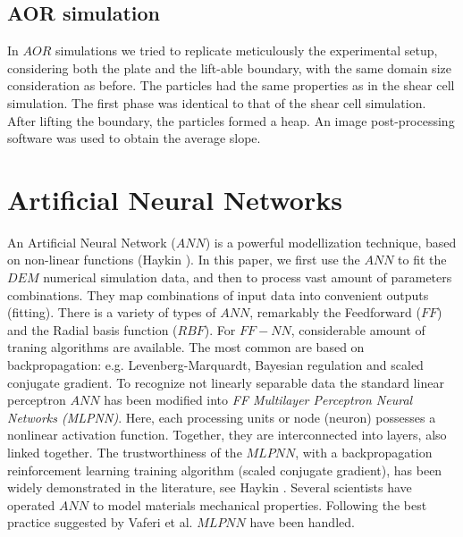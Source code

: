 \begin{appendix}
\subsection{AOR simulation}
\label{subsec:aorsimulation}
In $AOR$ simulations we tried to replicate meticulously the experimental setup, 
considering both the plate and the lift-able boundary, with the same domain size consideration as before. 
The particles had the same properties as in the shear cell simulation. The first phase was identical to that of the shear cell simulation. 
After lifting the boundary, the particles formed a heap.
An image post-processing software was used to obtain the average slope.



\section{Artificial Neural Networks}
\label{sec:appann}

An Artificial Neural Network ($ANN$) is a powerful modellization technique, 
based on non-linear functions (Haykin \cite{RefWorks:158}). 
In this paper, we first use the $ANN$ to fit the $DEM$ numerical simulation data, 
and then to process vast amount of parameters combinations. 
They map combinations of input data into convenient outputs (fitting). 
There is a variety of types of $ANN$, remarkably the Feedforward ($FF$) 
and the Radial basis function ($RBF$). For $FF-NN$, considerable amount 
of traning algorithms are available. The most common are based on backpropagation: 
e.g. Levenberg-Marquardt, Bayesian regulation and scaled conjugate gradient. 
To recognize not linearly separable data the standard linear perceptron $ANN$ 
has been modified into \textit{FF Multilayer Perceptron Neural Networks (MLPNN)}. 
Here, each processing units or node (neuron) possesses a nonlinear activation function. 
Together, they are interconnected into layers, also linked together. 
The trustworthiness of the $MLPNN$, with a backpropagation reinforcement learning 
training algorithm (scaled conjugate gradient), has been widely demonstrated in the 
literature, see Haykin \cite{RefWorks:158}. Several scientists 
\cite{RefWorks:161, RefWorks:166, RefWorks:167, RefWorks:168, RefWorks:169,
RefWorks:170, RefWorks:178, RefWorks:179} have operated $ANN$ to model materials
mechanical properties.
Following the best practice suggested by Vaferi et al. \cite{RefWorks:150} $MLPNN$ have been handled.


\end{appendix}
